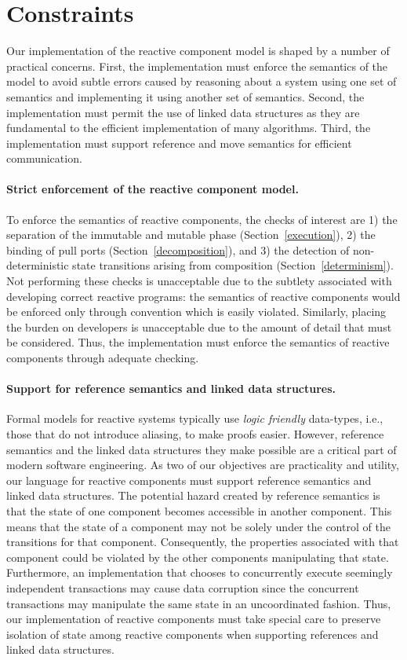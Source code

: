 \section{Constraints}

Our implementation of the reactive component model is shaped by a number of practical concerns.
First, the implementation must enforce the semantics of the model to avoid subtle errors caused by reasoning about a system using one set of semantics and implementing it using another set of semantics.
Second, the implementation must permit the use of linked data structures as they are fundamental to the efficient implementation of many algorithms.
Third, the implementation must support reference and move semantics for efficient communication.

\paragraph{Strict enforcement of the reactive component model.}
To enforce the semantics of reactive components, the checks of interest are 1) the separation of the immutable and mutable phase (Section~\ref{execution}), 2) the binding of pull ports (Section~\ref{decomposition}), and 3) the detection of non-deterministic state transitions arising from composition (Section~\ref{determinism}).
Not performing these checks is unacceptable due to the subtlety associated with developing correct reactive programs:  the semantics of reactive components would be enforced only through convention which is easily violated.
Similarly, placing the burden on developers is unacceptable due to the amount of detail that must be considered.
Thus, the implementation must enforce the semantics of reactive components through adequate checking.

\paragraph{Support for reference semantics and linked data structures.}
Formal models for reactive systems typically use \emph{logic friendly} data-types, i.e., those that do not introduce aliasing, to make proofs easier.
However, reference semantics and the linked data structures they make possible are a critical part of modern software engineering.
As two of our objectives are practicality and utility, our language for reactive components must support reference semantics and linked data structures.
The potential hazard created by reference semantics is that the state of one component becomes accessible in another component.
This means that the state of a component may not be solely under the control of the transitions for that component.
Consequently, the properties associated with that component could be violated by the other components manipulating that state.
Furthermore, an implementation that chooses to concurrently execute seemingly independent transactions may cause data corruption since the concurrent transactions may manipulate the same state in an uncoordinated fashion.
Thus, our implementation of reactive components must take special care to preserve isolation of state among reactive components when supporting references and linked data structures.

